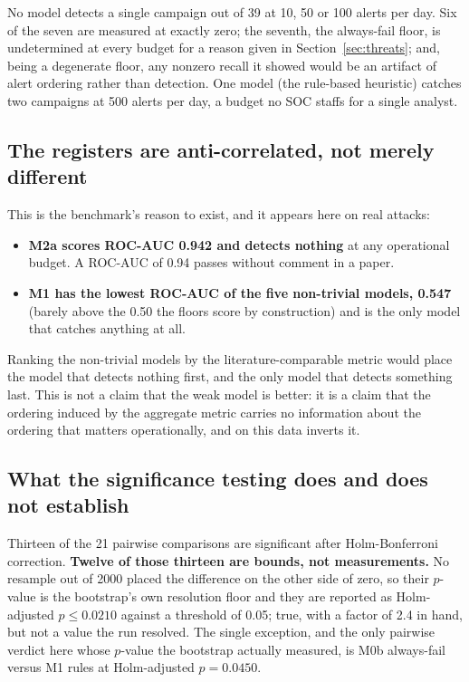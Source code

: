 \documentclass[11pt,a4paper]{article}
\begin{document}
No model detects a single campaign out of 39 at 10, 50 or 100 alerts per day.
Six of the seven are measured at exactly zero; the seventh, the always-fail
floor, is undetermined at every budget for a reason given in
Section~\ref{sec:threats}; and, being a degenerate floor, any nonzero recall it
showed would be an artifact of alert ordering rather than detection. One model
(the rule-based heuristic) catches two campaigns at 500 alerts per day, a
budget no SOC staffs for a single analyst.

\subsection{The registers are anti-correlated, not merely different}

This is the benchmark's reason to exist, and it appears here on real attacks:

\begin{itemize}
  \item \textbf{M2a scores ROC-AUC 0.942 and detects nothing} at any operational
  budget. A ROC-AUC of 0.94 passes without comment in a paper.
  \item \textbf{M1 has the lowest ROC-AUC of the five non-trivial models,
  0.547} (barely above the 0.50 the floors score by construction) and is the
  only model that catches anything at all.
\end{itemize}

Ranking the non-trivial models by the literature-comparable metric would place
the model that detects nothing first, and the only model that detects something
last. This is not a claim that the weak model is better: it is a claim that the
ordering induced by the aggregate metric carries no information about the
ordering that matters operationally, and on this data inverts it.

\subsection{What the significance testing does and does not establish}

Thirteen of the 21 pairwise comparisons are significant after Holm-Bonferroni
correction. \textbf{Twelve of those thirteen are bounds, not measurements.} No
resample out of 2000 placed the difference on the other side of zero, so their
$p$-value is the bootstrap's own resolution floor and they are reported as
Holm-adjusted $p \leq 0.0210$ against a threshold of 0.05; true, with a factor
of 2.4 in hand, but not a value the run resolved. The single exception, and the
only pairwise verdict here whose $p$-value the bootstrap actually measured, is
M0b always-fail versus M1 rules at Holm-adjusted $p = 0.0450$.
\end{document}
